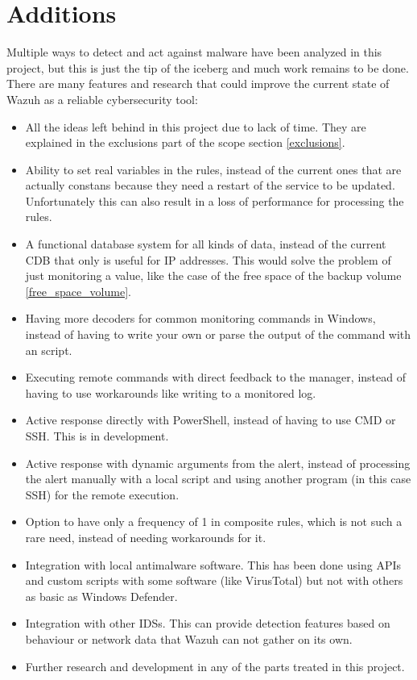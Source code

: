 \section{Additions}
Multiple ways to detect and act against malware have been analyzed in this project, but this is just the tip of the iceberg and much work remains to be done.
There are many features and research that could improve the current state of Wazuh as a reliable cybersecurity tool:
\begin{itemize}
	\item All the ideas left behind in this project due to lack of time. They are explained in the exclusions part of the scope section \ref{exclusions}.
	\item Ability to set real variables in the rules, instead of the current ones that are actually constans because they need a restart of the service to be updated.
Unfortunately this can also result in a loss of performance for processing the rules.
	\item A functional database system for all kinds of data, instead of the current CDB that only is useful for IP addresses. This would solve the problem of just monitoring a value, like the case of the free space of the backup volume \ref{free_space_volume}.
	\item Having more decoders for common monitoring commands in Windows, instead of having to write your own or parse the output of the command with an script.
	\item Executing remote commands with direct feedback to the manager, instead of having to use workarounds like writing to a monitored log.
	\item Active response directly with PowerShell, instead of having to use CMD or SSH. This is in development.
	\item Active response with dynamic arguments from the alert, instead of processing the alert manually with a local script and using another program (in this case SSH) for the remote execution.
	\item Option to have only a frequency of 1 in composite rules, which is not such a rare need, instead of needing workarounds for it.
	\item Integration with local antimalware software. This has been done using APIs and custom scripts with some software (like VirusTotal) but not with others as basic as Windows Defender.
	\item Integration with other IDSs. This can provide detection features based on behaviour or network data that Wazuh can not gather on its own.
	\item Further research and development in any of the parts treated in this project.
\end{itemize}
